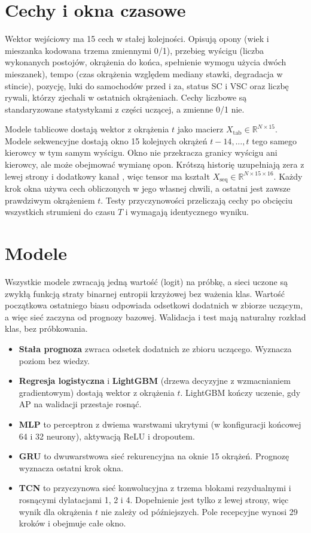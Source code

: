 \section{Cechy i okna czasowe}

Wektor wejściowy ma 15 cech w stałej kolejności. Opisują opony (wiek
i mieszanka kodowana trzema zmiennymi 0/1), przebieg wyścigu
(liczba wykonanych postojów, okrążenia do końca, spełnienie wymogu
użycia dwóch mieszanek), tempo (czas okrążenia względem mediany stawki,
degradacja w stincie), pozycję, luki do samochodów przed i za, status SC
i VSC oraz liczbę rywali, którzy zjechali w ostatnich okrążeniach. Cechy
liczbowe są standaryzowane statystykami z części uczącej, a zmienne 0/1 nie.

Modele tablicowe dostają wektor z okrążenia $t$ jako macierz
$X_{\mathrm{tab}}\in\mathbb{R}^{N\times15}$. Modele sekwencyjne dostają okno
15 kolejnych okrążeń $t-14,\dots,t$ tego samego kierowcy w tym samym
wyścigu. Okno nie przekracza granicy wyścigu ani kierowcy, ale może
obejmować wymianę opon. Krótszą historię uzupełniają zera z lewej strony
i dodatkowy kanał , więc tensor ma kształt
$X_{\mathrm{seq}}\in\mathbb{R}^{N\times15\times16}$. Każdy krok okna
używa cech obliczonych w jego własnej chwili, a ostatni jest zawsze
prawdziwym okrążeniem $t$. Testy przyczynowości przeliczają cechy
po obcięciu wszystkich strumieni do czasu $T$ i wymagają identycznego wyniku.

\section{Modele}

Wszystkie modele zwracają jedną wartość (logit) na próbkę, a sieci uczone są
zwykłą funkcją straty binarnej entropii krzyżowej bez ważenia klas. Wartość
początkowa ostatniego biasu odpowiada odsetkowi dodatnich w zbiorze
uczącym, a więc sieć zaczyna od prognozy bazowej. Walidacja i test mają
naturalny rozkład klas, bez próbkowania.

\begin{itemize}
\item \textbf{Stała prognoza} zwraca odsetek dodatnich ze zbioru uczącego.
Wyznacza poziom bez wiedzy.
\item \textbf{Regresja logistyczna} i \textbf{LightGBM} (drzewa
decyzyjne z wzmacnianiem gradientowym) dostają wektor z okrążenia $t$.
LightGBM kończy uczenie, gdy AP na walidacji przestaje rosnąć.
\item \textbf{MLP} to perceptron z dwiema warstwami ukrytymi (w konfiguracji
końcowej 64 i 32 neurony), aktywacją ReLU i dropoutem.
\item \textbf{GRU} to dwuwarstwowa sieć rekurencyjna na oknie 15 okrążeń.
Prognozę wyznacza ostatni krok okna.
\item \textbf{TCN} to przyczynowa sieć konwolucyjna z trzema blokami
rezydualnymi i rosnącymi dylatacjami 1, 2 i 4. Dopełnienie jest tylko
z lewej strony, więc wynik dla okrążenia $t$ nie zależy od późniejszych.
Pole recepcyjne wynosi 29 kroków i obejmuje całe okno.
\end{itemize}

